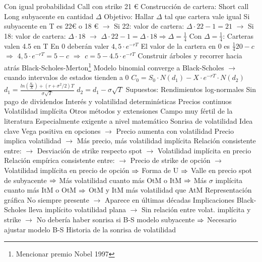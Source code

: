 \documentclass{nuevotema}
\begin{document}
\begin{esquemal}
				\4[] Con igual probabilidad
				\4[] Call con strike 21 €
				\4 Construcción de cartera:
				\4[] Short call
				\4[] Long subyacente en cantidad $\Delta$
				\4 Objetivo:
				\4[] Hallar $\Delta$ tal que cartera vale igual
				\4[] Si subyacente en T es 22€ o 18 €
				\4[] $\to$ Si 22: valor de cartera: $\Delta \cdot 22 - 1 = 21$
				\4[] $\to$ Si 18: valor de cartera: $\Delta \cdot 18$
				\4[] $\to$ $\Delta \cdot 22 - 1 = \Delta \cdot 18 \Rightarrow \Delta = \frac{1}{4}$
				\4 Con $\Delta = \frac{1}{4}$:
				\4[] Carteras valen 4.5 en T
				\4[] En 0 deberán valer $4,5 \cdot e^{-rT}$
				\4[] El valor de la cartera en 0 es $\frac{1}{4} 20 - c$
				\4[] $\Rightarrow$ $4,5 \cdot e^{-rT} = 5 - c$
				\4[] $\Rightarrow$ $c = 5 - 4.5 \cdot e^{-rT}$
				\4 Construir árboles y recorrer hacia atrás
			\3 Black-Scholes-Merton\footnote{Mencionar premio Nobel 1997}
				\4 Modelo binomial converge a Black-Scholes
				\4[] $\to$ cuando intervalos de estados tienden a 0
				\4 $C_0 = S_0 \cdot N(d_1) - X\cdot e^{-rT}\cdot N(d_2)$
				\4 $d_1 = \frac{ln(\frac{S_0}{X}) + (r+\sigma^2/2)T}{\sigma \sqrt{T}}$
				\4 $d_2 = d_1 - \sigma \sqrt{T}$
				\4 Supuestos:
				\4[] Rendimientos log-normales
				\4[] Sin pago de dividendos
				\4[] Interés y volatilidad determinísticas
				\4[] Precios continuos
				\4 Volatilidad implícita
			\3 Otros métodos y extensiones
				\4 Campo muy fértil de la literatura
				\4 Especialmente exigente a nivel matemático
			\3 Sonrisa de volatilidad
				\4 Idea clave
				\4[] Vega positiva en opciones
				\4[] $\to$ Precio aumenta con volatilidad
				\4[] Precio implica volatilidad
				\4[] $\to$ Más precio, más volatilidad implícita
				\4[] Relación consistente entre:
				\4[] $\to$ Desviación de strike respecto spot
				\4[] $\to$ Volatilidad implícita en precio
				\4 Relación empírica consistente entre:
				\4[] $\to$ Precio de strike de opción
				\4[] $\to$ Volatilidad implícita en precio de opción
				\4[] $\Rightarrow$ Forma de U
				\4[] $\Rightarrow$ Valle en precio spot de subyacente
				\4[] $\Rightarrow$ Más volatilidad cuanto más OtM o ItM
				\4[] $\Rightarrow$ Más $\sigma$ implícita cuanto más ItM o OtM
				\4[] $\Rightarrow$ OtM y ItM más volatilidad que AtM
				\4[] Representación gráfica
				\4[] 
				\4[] No siempre presente
				\4[] $\to$ Aparece en últimas décadas
				\4 Implicaciones
				\4[] Black-Scholes lleva implícito volatilidad plana
				\4[] $\to$ Sin relación entre volat. implícita y strike
				\4[] $\to$ No debería haber sonrisa si B-S modelo subyacente
				\4[] $\Rightarrow$ Necesario ajustar modelo B-S
				\4 Historia de la sonrisa de volatilidad

\end{esquemal}
\end{document}
